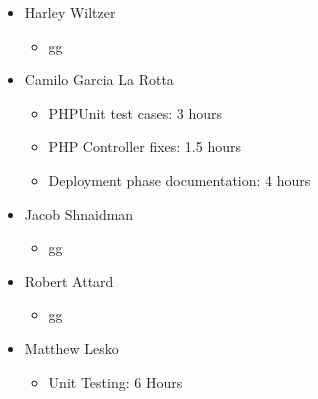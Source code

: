 \documentclass[12pt]{article}
\begin{document}
 \begin{itemize}
     \item Harley Wiltzer
 		\begin{itemize}
 			\item gg
 		\end{itemize}
     \item Camilo Garcia La Rotta
     \begin{itemize}
         \item PHPUnit test cases: 3 hours
         \item PHP Controller fixes: 1.5 hours
         \item Deployment phase documentation: 4 hours
     \end{itemize}
     \item Jacob Shnaidman
     \begin{itemize}
         \item gg
     \end{itemize}
     \item Robert Attard
     \begin{itemize}
         \item gg
     \end{itemize}
     \item Matthew Lesko
     \begin{itemize}
     	\item Unit Testing: 6 Hours
     \end{itemize}
 \end{itemize}




\end{document}
